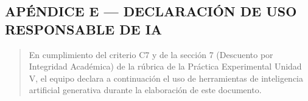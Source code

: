 %

\subsection{APÉNDICE E --- DECLARACIÓN DE USO RESPONSABLE DE
IA}\label{apuxe9ndice-e-declaraciuxf3n-de-uso-de-ia}

\begin{quote}
En cumplimiento del criterio C7 y de la sección 7 (Descuento por
Integridad Académica) de la rúbrica de la Práctica Experimental Unidad
V, el equipo declara a continuación el uso de herramientas de
inteligencia artificial generativa durante la elaboración de este
documento.
\end{quote}


